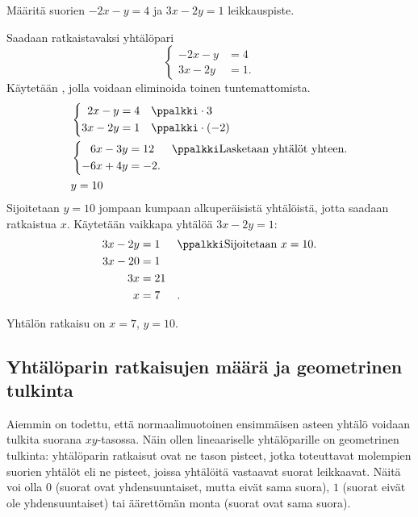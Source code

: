 \begin{esimerkki}
Määritä suorien $-2x-y= 4$ ja $3x-2y=1$ leikkauspiste.
\begin{esimratk}
Saadaan ratkaistavaksi yhtälöpari
\[
\left\{
\begin{aligned}
-2x-y&= 4 \\
3x-2y&= 1.
\end{aligned}
\right.
\]
Käytetään , jolla voidaan eliminoida toinen tuntemattomista.
\begin{align*}
  &\left\{
    \begin{aligned}
    2x-y&= 4 && \ppalkki \cdot 3\\
    3x-2y&= 1 && \ppalkki \cdot (-2)
    \end{aligned}
  \right. \\
  &\left\{
    \begin{aligned}
    6x-3y&= 12 && \ppalkki \text{Lasketaan yhtälöt yhteen.}\\
    -6x+4y&= -2.&&
    \end{aligned}
  \right.\\
  &y= 10 \\
\end{align*}
Sijoitetaan $y=10$ jompaan kumpaan alkuperäisistä yhtälöistä, jotta saadaan ratkaistua $x$. Käytetään vaikkapa yhtälöä $3x-2y=1$:
\begin{align*}
3x-2y&=1 && \ppalkki \text{Sijoitetaan $x=10$.} \\
3x-20&=1 && \\
3x&=21 && \\
x&=7 &&.
\end{align*}
\end{esimratk}
\begin{esimvast}
Yhtälön ratkaisu on $x=7$, $y=10$.
\end{esimvast}
\end{esimerkki}


\subsection*{Yhtälöparin ratkaisujen määrä ja geometrinen tulkinta}

Aiemmin on todettu, että normaalimuotoinen ensimmäisen asteen yhtälö voidaan tulkita suorana
$xy$-tasossa. Näin ollen lineaariselle yhtälöparille on geometrinen tulkinta: yhtälöparin
ratkaisut ovat ne tason pisteet, jotka toteuttavat  molempien suorien yhtälöt
eli ne pisteet, joissa yhtälöitä vastaavat suorat leikkaavat.
Näitä voi olla $0$ (suorat ovat yhdensuuntaiset, mutta eivät sama suora),
$1$ (suorat eivät ole yhdensuuntaiset) tai äärettömän monta (suorat ovat sama
suora).

